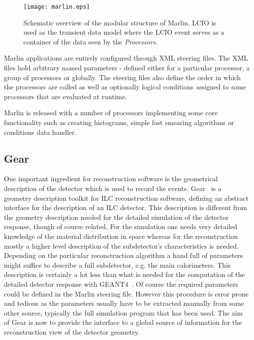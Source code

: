 \begin{figure}[htb]
\centering
\texttt{[image: marlin.eps]}
\caption{
Schematic overview of the modular structure of Marlin. LCIO is used as the
transient data model where the LCIO event serves as a
container of the data seen by the {\em Processors}.
}
\label{fig_marlin}
\end{figure}

Marlin applications are entirely configured through XML steering files.
The XML files hold arbitrary named parameters - defined
either for a particular processor, a group of processors or globally. The
steering files also define the order in which the
processors are called as well as optionally logical conditions assigned to
some processors that are evaluated at runtime.

Marlin is released with a number of processors implementing some core
functionality such as creating histograms,
simple fast smearing algorithms or conditions data handler.

\subsection{Gear}

One important ingredient for reconstruction software is the geometrical
description of the detector which is used to record the events.
Gear~\cite{ref_gear} is a geometry description toolkit for ILC reconstruction software,
defining an abstract interface for the description of an ILC detector.
This description is different from the geometry description needed for the
detailed simulation of the detector response, though of course related. For the
simulation one needs very detailed knowledge of the material
distribution in space whereas for the reconstruction mostly a higher
level description of the subdetector's characteristics is needed.
Depending on the particular reconstruction algorithm a hand full of
parameters might suffice to describe a full subdetector, e.g. the main
calorimeters.
This description is certainly a lot less than what is needed for the
computation of the detailed detector response with GEANT4~\cite{ref_geant4}.
Of course the required parameters could be defined in the Marlin steering
file. However this procedure is error prone and tedious as the parameters
usually have to be extracted manually
from some other source, typically the full simulation
program that has been used.
The aim of Gear is now to provide the interface to a
global source of information for the reconstruction view of the
detector geometry.

